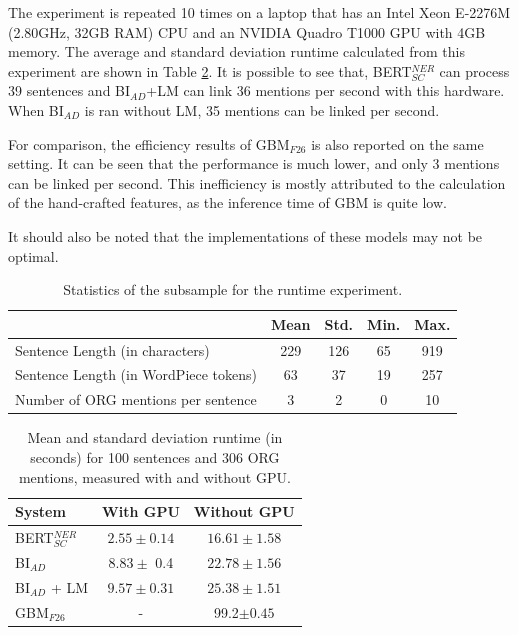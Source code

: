 \documentclass{report}
\theoremstyle{definition}
\theoremstyle{remark}
\begin{document}
The experiment is repeated 10 times on a laptop that has an Intel Xeon E-2276M (2.80GHz, 32GB RAM) CPU and an NVIDIA Quadro T1000 GPU with 4GB memory. The average and standard deviation runtime calculated from this experiment are shown in Table \ref{tab:efficiencyresults}. It is possible to see that, BERT$_{SC}^{NER}$ can process 39 sentences and BI$_{AD}$+LM can link 36 mentions per second with this hardware. When BI$_{AD}$ is ran without LM, 35 mentions can be linked per second. 

For comparison, the efficiency results of GBM$_{F26}$ is also reported on the same setting. It can be seen that the performance is much lower, and only 3 mentions can be linked per second. This inefficiency is mostly attributed to the calculation of the hand-crafted features, as the inference time of GBM is quite low.

It should also be noted that the implementations of these models may not be optimal.

\begin{table}[H]
    \centering
    \begin{tabular}{l|cccc}
    &  Mean & Std. & Min. & Max.\\
    \hline
    Sentence Length (in characters) &  229 & 126 & 65 & 919\\
    Sentence Length (in WordPiece tokens) & 63 & 37 & 19 & 257\\
    Number of ORG mentions per sentence & 3 & 2 & 0 & 10\\
    \end{tabular}
    \caption{Statistics of the subsample for the runtime experiment.}
    \label{tab:efficiencystats}
\end{table}

\begin{table}[H]
    \centering
    \begin{tabular}{l|cc}
    System   & With GPU & Without GPU  \\
    \hline
    BERT$_{SC}^{NER}$  & $2.55 \pm 0.14$ & $16.61 \pm 1.58$\\
    BI$_{AD}$ & $8.83 \pm $ 0.4 & $22.78 \pm 1.56$\\
    BI$_{AD}$ + LM & $9.57 \pm 0.31$ &$25.38 \pm 1.51$\\
    GBM$_{F26}$ &-& 99.2$\pm 0.45$ \\
    \end{tabular}
    \caption{Mean and standard deviation runtime (in seconds) for 100 sentences and 306 ORG mentions, measured with and without GPU.}
    \label{tab:efficiencyresults}
\end{table}
\end{document}

